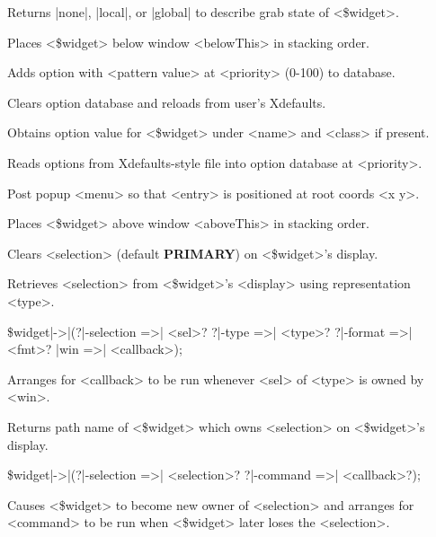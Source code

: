 \begin{enum}{1cm}
Returns |none|, |local|, or |global| to describe grab state of <\$widget>.

Places <\$widget> below window <belowThis> in stacking order.

Adds option with <pattern value> at <priority> (0-100) to database.

Clears option database and reloads from user's Xdefaults.

Obtains option value for <\$widget> under <name> and <class> if present.

Reads options from Xdefaults-style file into option database at <priority>.

Post popup <menu> so that <entry> is positioned at root coords <x y>.

Places <\$widget> above window <aboveThis> in stacking order.

Clears <selection> (default {\bf PRIMARY}) on <\$widget>'s display.

Retrieves <selection> from <\$widget>'s <display> using representation <type>.

\item[\$widget|->|\kwd{selectionHandle}(?|-selection =>| <sel>? ?|-type =>| <type>?]
  ?|-format =>| <fmt>? |win =>| <callback>);\strut\newline
Arranges for <callback> to be run whenever <sel> of <type> is owned by <win>.

Returns path name of <\$widget> which owns <selection> on <\$widget>'s display.

\item[\$widget|->|\kwd{selectionOwn}(?|-selection =>| <selection>?]
  ?|-command =>| <callback>?);\strut\newline
Causes <\$widget> to become new owner of <selection> and arranges for
<command> to be run when <\$widget> later loses the <selection>.


\end{enum}
